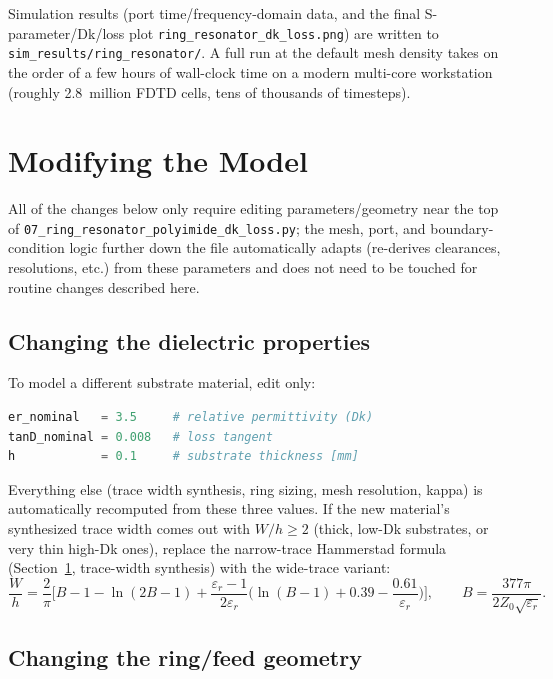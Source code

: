 \documentclass[11pt]{article}
\begin{document}
Simulation results (port time/frequency-domain data, and the final
S-parameter/Dk/loss plot \texttt{ring\_resonator\_dk\_loss.png}) are written
to \texttt{sim\_results/ring\_resonator/}. A full run at the default mesh
density takes on the order of a few hours of wall-clock time on a modern
multi-core workstation (roughly 2.8~million FDTD cells, tens of thousands
of timesteps).

\section{Modifying the Model}
\label{sec:modifying}

All of the changes below only require editing parameters/geometry near the
top of \texttt{07\_ring\_resonator\_polyimide\_dk\_loss.py}; the mesh, port,
and boundary-condition logic further down the file automatically adapts
(re-derives clearances, resolutions, etc.) from these parameters and does
not need to be touched for routine changes described here.

\subsection{Changing the dielectric properties}

To model a different substrate material, edit only:
\begin{lstlisting}[language=Python]
er_nominal   = 3.5     # relative permittivity (Dk)
tanD_nominal = 0.008   # loss tangent
h            = 0.1     # substrate thickness [mm]
\end{lstlisting}
Everything else (trace width synthesis, ring sizing, mesh resolution,
kappa) is automatically recomputed from these three values. If the new
material's synthesized trace width comes out with $W/h \geq 2$ (thick,
low-Dk substrates, or very thin high-Dk ones), replace the narrow-trace
Hammerstad formula (Section~\ref{sec:modifying}, trace-width synthesis)
with the wide-trace variant:
\[
\frac{W}{h} = \frac{2}{\pi}\Big[B - 1 - \ln(2B-1)
  + \frac{\varepsilon_r - 1}{2\varepsilon_r}
    \Big(\ln(B-1) + 0.39 - \frac{0.61}{\varepsilon_r}\Big)\Big],
\qquad B = \frac{377\pi}{2 Z_0 \sqrt{\varepsilon_r}}.
\]

\subsection{Changing the ring/feed geometry}
\end{document}
